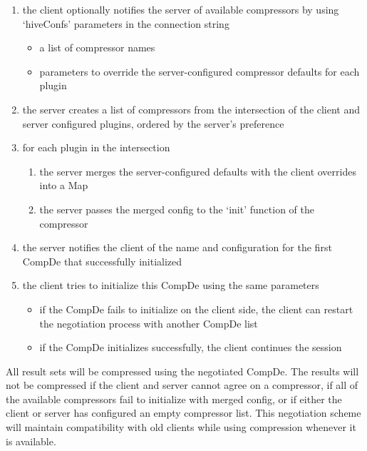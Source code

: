 \documentclass[11pt,a4paper]{article}
\begin{document}
		\begin{enumerate}
			
			\item the client optionally notifies the server of available compressors by using `hiveConfs' parameters in the connection string
			\begin{itemize}
				\item a list of compressor names
				\item parameters to override the server-configured compressor defaults for each plugin
			\end{itemize}
			
			\item the server creates a list of compressors from the intersection of the client and server configured plugins, ordered by the server's preference
			
			\item for each plugin in the intersection
			\begin{enumerate}[1.]
				\item the server merges the server-configured defaults with the client overrides into a Map
				\item the server passes the merged config to the `init' function of the compressor
			\end{enumerate}
			
			\item the server notifies the client of the name and configuration for the first CompDe that successfully initialized
			
			\item the client tries to initialize this CompDe using the same parameters
			\begin{itemize}
				\item if the CompDe fails to initialize on the client side, the client can restart the negotiation process with another CompDe list
				\item if the CompDe initializes successfully, the client continues the session
			\end{itemize}
			
		\end{enumerate}
		
		All result sets will be compressed using the negotiated CompDe.
		The results will not be compressed if the client and server cannot agree on a compressor, if all of the available compressors fail to initialize with merged config, or if either the client or server has configured an empty compressor list.
		This negotiation scheme will maintain compatibility with old clients while using compression whenever it is available.
		
\end{document}
